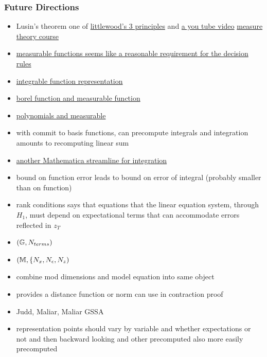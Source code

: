 \documentclass[tikz]{beamer}
\begin{document}
\begin{frame}
  \frametitle{Future Directions}
  \begin{itemize}
  \item Lusin's theorem one of \href{https://faculty.etsu.edu/gardnerr/5210/notes/3-3.pdf}{littlewood's 3 principles}   and \href{https://www.youtube.com/watch?v=-jOcbJpWttc}{a you tube video}  \href{http://web.maths.unsw.edu.au/~potapov/5825_2013/}{measure theory course }
  \item \href{http://math.stackexchange.com/questions/176379/approximation-of-bounded-measurable-functions-with-continuous-functions}{measurable functions seems like a reasonable requirement for the decision rules}
  \item \href{http://math.stackexchange.com/questions/76931/finding-simple-step-and-continuous-functions-to-satisfy-lebesgue-integral-cond}{integrable function representation}
  \item \href{http://math.stackexchange.com/questions/434239/measurable-function-approximated-by-borel-function}{borel function and measurable function}
  \item \href{http://math.stackexchange.com/questions/573158/approximate-a-complex-measurable-function-pointwisely-almost-everywhere-by-polyn}{polynomials and measurable}
  \item with commit to basis functions, can precompute integrals and 
integration amounts to recomputing linear sum
\item  \href{http://www.mathematica-journal.com/2008/11/dynamic-integration-of-interpolating-functions-and-some-concrete-optimal-stopping-problems/}{another Mathematica streamline for integration}
\item bound on function error leads to bound on error of integral (probably smaller than on function)
  \item rank conditions says that equations that the linear equation
system, through $H_1$,  must depend on expectational terms that can accommodate
errors reflected in $z_T$ 
  \item $({\mathbb{G}},{N_{terms}})$
  \item $(\mathbb{M},\{{N_x},{N_\epsilon},{N_z})$
  \item combine mod dimensions and model equation into same object
  \item provides a distance function or norm can use in contraction proof
  \item Judd, Maliar, Maliar GSSA
  \item representation points should vary by variable and whether expectations or not and then backward looking and other precomputed also more easily precomputed

\end{itemize}
\end{frame}
\end{document}
